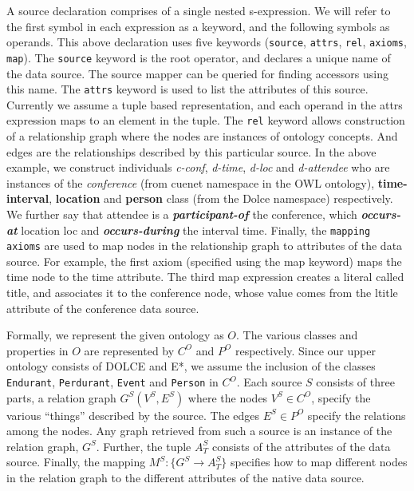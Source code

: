 A source declaration comprises of a single nested s-expression. We will refer to the first symbol in each expression as a keyword, and the following symbols as operands. This above declaration uses five keywords (\texttt{source}, \texttt{attrs}, \texttt{rel}, \texttt{axioms}, \texttt{map}).  The \texttt{source} keyword is the root operator, and declares a unique name of the data source. The source mapper can be queried for finding accessors using this name. The \texttt{attrs} keyword is used to list the attributes of this source. Currently we assume a tuple based representation, and each operand in the attrs expression maps to an element in the tuple. The \texttt{rel} keyword allows construction of a relationship graph where the nodes are instances of ontology concepts. And edges are the relationships described by this particular source. In the above example, we construct individuals \textit{c-conf}, \textit{d-time}, \textit{d-loc} and \textit{d-attendee} who are instances of the \textit{conference} (from cuenet namespace in the OWL ontology), \textbf{time-interval}, \textbf{location} and \textbf{person} class (from the Dolce namespace) respectively. We further say that attendee is a \textbf{\textit{participant-of}} the conference, which \textbf{\textit{occurs-at}} location loc and \textbf{\textit{occurs-during}} the interval time. Finally, the \texttt{mapping axioms} are used to map nodes in the relationship graph to attributes of the data source. For example, the first axiom (specified using the map keyword) maps the time node to the time attribute. The third map expression creates a literal called title, and associates it to the conference node, whose value comes from the ltitle attribute of the conference data source.

Formally, we represent the given ontology as $O$. The various classes and properties in $O$ are represented by $C^O$ and $P^O$ respectively. Since our upper ontology consists of DOLCE and E*, we assume the inclusion of the classes \texttt{Endurant}, \texttt{Perdurant}, \texttt{Event} and \texttt{Person} in $C^O$. Each source $S$ consists of three parts, a relation graph $G^S(V^S, E^S)$ where the nodes $V^S \in C^O$, specify the various ``things'' described by the source. The edges $E^S \in P^O$ specify the relations among the nodes. Any graph retrieved from such a source is an instance of the relation graph, $G^S$. Further, the tuple $A^S_T$ consists of the attributes of the data source. Finally, the mapping $M^S: \{G^S \rightarrow A^S_T\}$ specifies how to map different nodes in the relation graph to the different attributes of the native data source.

